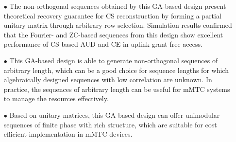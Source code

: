 \documentclass[journal]{IEEEtran}
\numberwithin{const2}{const}
\begin{document}
\begin{itemize}
	\item[$\bullet$] The non-orthogonal sequences obtained by this GA-based design
	present theoretical recovery guarantee for CS reconstruction by 
	forming a partial unitary matrix through arbitrary row selection.  
	Simulation results confirmed that the Fourier- and ZC-based sequences from this design
	show excellent performance
	of CS-based AUD and CE in uplink grant-free access. %
	\item[$\bullet$] This GA-based design is able to generate non-orthogonal sequences of arbitrary length,
	which can be a good choice for sequence lengths for which algebraically designed sequences with low correlation are unknown.
	In practice, the sequences of arbitrary length can be useful
	for mMTC systems to manage the resources effectively.
	\item[$\bullet$] Based on unitary matrices, this GA-based design
	can offer unimodular sequences of finite phase with rich structure, which 
	are suitable for cost efficient implementation in mMTC devices.	
\end{itemize}
 
\end{document}
